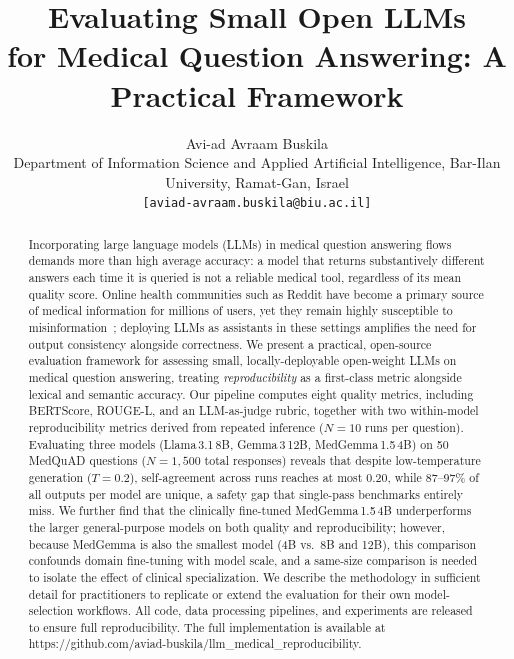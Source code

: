 \documentclass[11pt]{article}
\title{\textbf{Evaluating Small Open LLMs\\
for Medical Question Answering: A Practical Framework}}
\author{
  Avi-ad Avraam Buskila\\
  \small Department of Information Science and Applied Artificial Intelligence, Bar-Ilan University, Ramat-Gan, Israel\\[-2pt]
  \small \texttt{[aviad-avraam.buskila@biu.ac.il]}
}
\date{}
\begin{document}
\doublespacing
\maketitle

\begin{abstract}
Incorporating large language models (LLMs) in medical question answering
flows demands more than high average accuracy: a model that returns
substantively different answers each time it is queried is not a reliable
medical tool, regardless of its mean quality score.
Online health communities such as Reddit have become a primary source of
medical information for millions of users, yet they remain highly
susceptible to misinformation~\cite{suarezlledo2021misinfo, sager2021reddit};
deploying LLMs as assistants in these settings amplifies the need for
output consistency alongside correctness.
We present a practical, open-source evaluation framework for
assessing small, locally-deployable open-weight LLMs on medical
question answering, treating \emph{reproducibility} as a first-class
metric alongside lexical and semantic accuracy.
Our pipeline computes eight quality metrics, including BERTScore,
ROUGE-L, and an LLM-as-judge rubric, together with two
within-model reproducibility metrics derived from repeated inference
($N{=}10$ runs per question).
Evaluating three models
(Llama\,3.1\,8B, Gemma\,3\,12B, MedGemma\,1.5\,4B) on 50 MedQuAD
questions ($N{=}1{,}500$ total responses) reveals that despite
low-temperature generation ($T{=}0.2$), self-agreement across runs
reaches at most 0.20, while 87--97\% of all outputs per model are
unique, a safety gap that single-pass benchmarks entirely miss.
We further find that the clinically fine-tuned
MedGemma\,1.5\,4B underperforms the larger general-purpose models
on both quality and reproducibility; however, because MedGemma is also
the smallest model (4B vs.\ 8B and 12B), this comparison confounds
domain fine-tuning with model scale, and a same-size comparison
is needed to isolate the effect of clinical specialization.
We describe the methodology in sufficient detail for practitioners
to replicate or extend the evaluation for their own model-selection
workflows. All code, data processing pipelines, and experiments are 
released to ensure full reproducibility. The full implementation 
is available at 
https://github.com/aviad-buskila/llm\_medical\_reproducibility.
\end{abstract}

\end{document}
